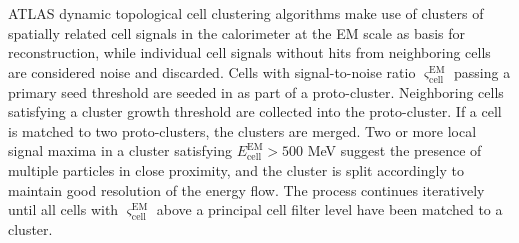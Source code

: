 \documentclass[../thesis.tex]{subfiles}
\begin{document}
ATLAS dynamic topological cell clustering algorithms make use of clusters of spatially related cell signals in the calorimeter at the \acs{EM} scale as basis for reconstruction, while individual cell signals without hits from neighboring cells are considered noise and discarded.
Cells with signal-to-noise ratio $\varsigma_\mathrm{cell}^\mathrm{EM}$ passing a primary seed threshold are seeded in as part of a proto-cluster. Neighboring cells satisfying a cluster growth threshold are collected into the proto-cluster. If a cell is matched to two proto-clusters, the clusters are merged. Two or more local signal maxima in a cluster satisfying $E_\mathrm{cell}^\mathrm{EM}>500$ MeV suggest the presence of multiple particles in close proximity, and the cluster is split accordingly to maintain good resolution of the energy flow. The process continues iteratively until all cells with $\varsigma_\mathrm{cell}^\mathrm{EM}$ above a principal cell filter level have been matched to a cluster.
\end{document}
